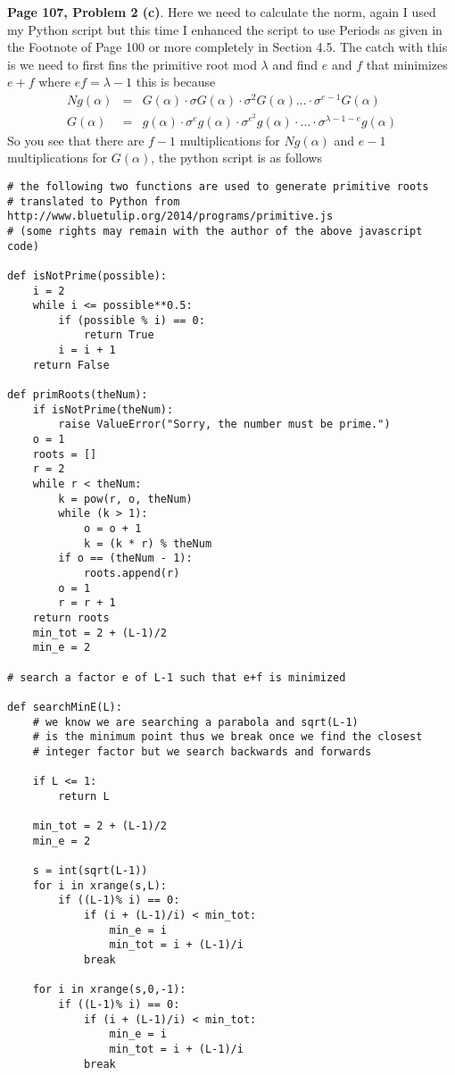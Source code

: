 \documentclass[aps,preprint,preprintnumbers,nofootinbib,showpacs,prd]{revtex4-1}
\newcommand{\nbea}{\begin{eqnarray*}}
\newcommand{\neea}{\end{eqnarray*}}
\begin{document}
{\bf Page 107, Problem 2 (c)}. Here we need to calculate the norm, again I used my Python script but this time I enhanced the script to use Periods as given in the Footnote of Page 100 or more completely in Section 4.5. The catch with this is we need to first fins the primitive root mod $\lambda$ and find $e$ and $f$ that minimizes $e + f$ where $ef = \lambda - 1$ this is because
%
\nbea
Ng(\alpha) & = & G(\alpha) \cdot \sigma G(\alpha) \cdot \sigma^2 G(\alpha) \dots \cdot \sigma^{e-1} G(\alpha) \\
G(\alpha) & = & g(\alpha) \cdot \sigma^e g(\alpha) \cdot \sigma^{e^2} g(\alpha) \cdot \dots \cdot \sigma^{\lambda - 1 -e} g(\alpha)
\neea
%
So you see that there are $f-1$ multiplications for $Ng(\alpha)$ and $e - 1$ multiplications for $G(\alpha)$, the python script is as follows
%
\begin{Verbatim}[baselinestretch=0.75]
# the following two functions are used to generate primitive roots
# translated to Python from http://www.bluetulip.org/2014/programs/primitive.js
# (some rights may remain with the author of the above javascript code)

def isNotPrime(possible):
    i = 2
    while i <= possible**0.5:
        if (possible % i) == 0:
            return True
        i = i + 1
    return False

def primRoots(theNum):
    if isNotPrime(theNum):
        raise ValueError("Sorry, the number must be prime.")
    o = 1
    roots = []
    r = 2
    while r < theNum:
        k = pow(r, o, theNum)
        while (k > 1):
            o = o + 1
            k = (k * r) % theNum
        if o == (theNum - 1):
            roots.append(r)
        o = 1
        r = r + 1
    return roots
    min_tot = 2 + (L-1)/2
    min_e = 2

# search a factor e of L-1 such that e+f is minimized

def searchMinE(L):
    # we know we are searching a parabola and sqrt(L-1)
    # is the minimum point thus we break once we find the closest
    # integer factor but we search backwards and forwards

    if L <= 1:
        return L

    min_tot = 2 + (L-1)/2
    min_e = 2
    
    s = int(sqrt(L-1))
    for i in xrange(s,L):
        if ((L-1)% i) == 0:
            if (i + (L-1)/i) < min_tot:
                min_e = i
                min_tot = i + (L-1)/i
            break

    for i in xrange(s,0,-1):
        if ((L-1)% i) == 0:
            if (i + (L-1)/i) < min_tot:
                min_e = i
                min_tot = i + (L-1)/i
            break


\end{Verbatim}
\end{document}
